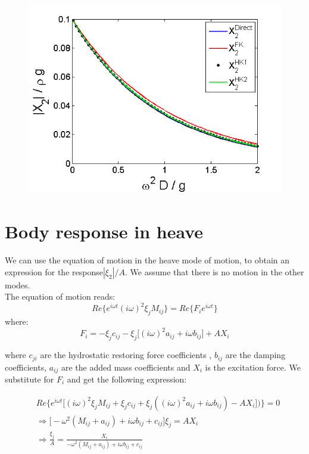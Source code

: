 \documentclass[a4paper,10pt]{article}
\begin{document}
\begin{figure}[H]
  \caption{}\label{X2_2_box2}
\endminipage
{}%
  \includegraphics[width=\linewidth]{X2_2_box3.png}
  \caption{}\label{X2_2_box3}
\endminipage
\end{figure}

\section{Body response in heave}

We can use the equation of motion in the heave mode of motion, to obtain an expression for the response$|\xi_2|/A$. We assume that there is no motion in the other modes.\\

The equation of motion reads:
$$Re \Big\{e^{i \omega t} (i \omega)^2 \xi_j M_{ij} \Big\} = Re \Big\{ F_i e^{i \omega t} \Big\}$$
where:
$$F_i = -\xi_j c_{i j} - \xi_j \Big[ (i \omega)^2 a_{i j} + i \omega b_{i j} \Big] + A X_i$$

where $c_{j i}$ are the hydrostatic restoring force coefficients , $b_{i j}$ are the damping coefficients, $a_{i j}$ are the added mass coefficients and $X_i$ is the excitation force. We substitute for $F_i$ and get the following expression:

\begin{align}
&Re \Big\{ e^{i \omega t}\big[(i \omega)^2 \xi_j M_{ij} + \xi_j c_{ij} +\xi_j ((i \omega)^2 a_{ij} + i \omega b_{ij})- AX_i \big]) \Big\} = 0\\
& \Rightarrow \Big[ -\omega^2(M_{ij} + a_{ij})+ i \omega b_{ij} + c_{ij} \Big] \xi_j = AX_i\\
& \Rightarrow \frac{\xi_j}{A} = \frac{X_i}{-\omega^2 (M_{ij} + a_{ij}) + i \omega b_{ij} + c_{ij}}\\
\end{align}
\end{document}
